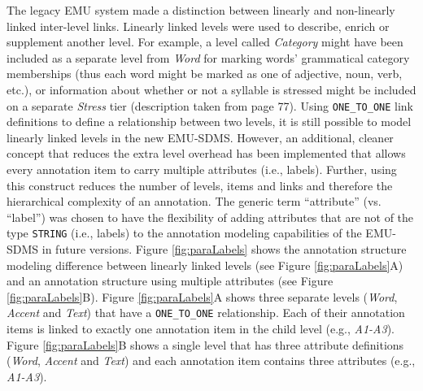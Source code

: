 \documentclass[]{book}
\theoremstyle{definition}
\theoremstyle{definition}
\theoremstyle{definition}
\theoremstyle{remark}
\begin{document}
The legacy EMU system made a distinction between linearly and
non-linearly linked inter-level links. Linearly linked levels were used
to describe, enrich or supplement another level. For example, a level
called \emph{Category} might have been included as a separate level from
\emph{Word} for marking words' grammatical category memberships (thus
each word might be marked as one of adjective, noun, verb, etc.), or
information about whether or not a syllable is stressed might be
included on a separate \emph{Stress} tier (description taken from
\citet{harrington:2010a} page 77). Using \texttt{ONE\_TO\_ONE} link
definitions to define a relationship between two levels, it is still
possible to model linearly linked levels in the new EMU-SDMS. However,
an additional, cleaner concept that reduces the extra level overhead has
been implemented that allows every annotation item to carry multiple
attributes (i.e., labels). Further, using this construct reduces the
number of levels, items and links and therefore the hierarchical
complexity of an annotation. The generic term ``attribute'' (vs.
``label'') was chosen to have the flexibility of adding attributes that
are not of the type \texttt{STRING} (i.e., labels) to the annotation
modeling capabilities of the EMU-SDMS in future versions. Figure
\ref{fig:paraLabels} shows the annotation structure modeling difference
between linearly linked levels (see Figure \ref{fig:paraLabels}A) and an
annotation structure using multiple attributes (see Figure
\ref{fig:paraLabels}B). Figure \ref{fig:paraLabels}A shows three
separate levels (\emph{Word}, \emph{Accent} and \emph{Text}) that have a
\texttt{ONE\_TO\_ONE} relationship. Each of their annotation items is
linked to exactly one annotation item in the child level (e.g.,
\emph{A1-A3}). Figure \ref{fig:paraLabels}B shows a single level that
has three attribute definitions (\emph{Word}, \emph{Accent} and
\emph{Text}) and each annotation item contains three attributes (e.g.,
\emph{A1-A3}).
\end{document}
